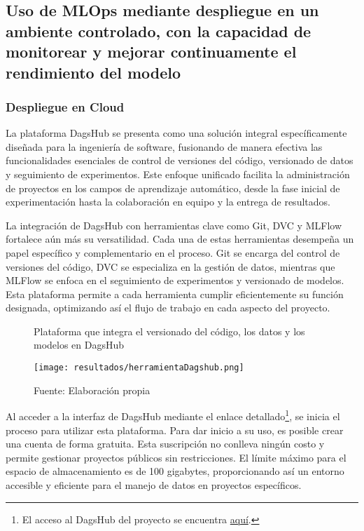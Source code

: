 \subsection{Uso de MLOps mediante despliegue en un ambiente controlado, con la capacidad de monitorear y mejorar continuamente el rendimiento del modelo}

\subsubsection{Despliegue en Cloud}

La plataforma DagsHub se presenta como una solución integral específicamente diseñada para la ingeniería de software, fusionando de manera efectiva las funcionalidades esenciales de control de versiones del código, versionado de datos y seguimiento de experimentos. Este enfoque unificado facilita la administración de proyectos en los campos de aprendizaje automático, desde la fase inicial de experimentación hasta la colaboración en equipo y la entrega de resultados. \newline

La integración de DagsHub con herramientas clave como Git, DVC y MLFlow fortalece aún más su versatilidad. Cada una de estas herramientas desempeña un papel específico y complementario en el proceso. Git se encarga del control de versiones del código, DVC se especializa en la gestión de datos, mientras que MLFlow se enfoca en el seguimiento de experimentos y versionado de modelos. Esta plataforma permite a cada herramienta cumplir eficientemente su función designada, optimizando así el flujo de trabajo en cada aspecto del proyecto.

\newpage

\begin{figure}[h]
\centering
\caption{Plataforma que integra el versionado del código, los datos y los modelos en DagsHub}
\texttt{[image: resultados/herramientaDagshub.png]}
\caption*{\footnotesize Fuente: Elaboración propia}
\label{fig:figuraHerramientaDagshub}
\end{figure}

Al acceder a la interfaz de DagsHub mediante el enlace detallado\footnote{El acceso al DagsHub del proyecto se encuentra \href{https://dagshub.com/juferoto/mlops_project}{aquí}.}, se inicia el proceso para utilizar esta plataforma. Para dar inicio a su uso, es posible crear una cuenta de forma gratuita. Esta suscripción no conlleva ningún costo y permite gestionar proyectos públicos sin restricciones. El límite máximo para el espacio de almacenamiento es de 100 gigabytes, proporcionando así un entorno accesible y eficiente para el manejo de datos en proyectos específicos.

